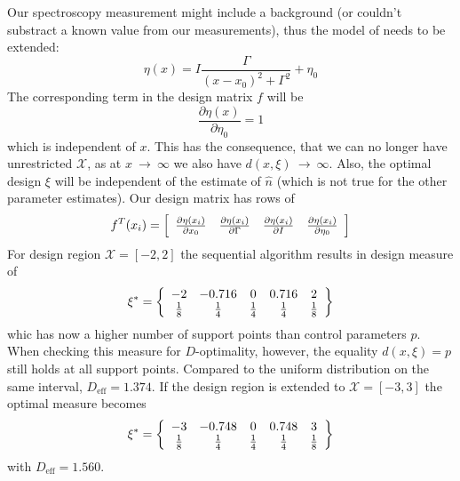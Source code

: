 \documentclass[12pt]{iopart}
\begin{document}
Our spectroscopy measurement might include a background (or couldn't substract a known value from our measurements), thus the model of  needs to be extended:
\begin{equation}
\eta(x) = I \frac{\Gamma}{(x - x_0)^2 + \Gamma^2} + \eta_0
\label{eq:lorentz4}
\end{equation}
The corresponding term in the design matrix $f$ will be
\begin{equation}
\frac{\partial \eta(x)}{\partial \eta_0} = 1
\end{equation}
which is independent of $x$. This has the consequence, that we can no longer have unrestricted $\mathcal{X}$, as at $x~\rightarrow~\infty$ we also have $d(x,\xi)~\rightarrow~\infty$. Also, the optimal design $\xi$ will be independent of the estimate of $\hat n$ (which is not true for the other parameter estimates). Our design matrix has rows of
\begin{equation}
 f^T(x_i) = \left[
  \begin{array}{l l l l}
   \frac{\partial \eta(x_i)}{\partial x_0} & \frac{\partial \eta(x_i)}{\partial \Gamma} & \frac{\partial \eta(x_i)}{\partial I} & \frac{\partial \eta(x_i)}{\partial \eta_0}
  \end{array} \right ]
\end{equation}
For design region $\mathcal{X} = [-2, 2]$ the sequential algorithm results in design measure of
\begin{equation}
\xi^* = \left\{
  \begin{array}{c c c c c}
    -2 & -0.716 & 0 & 0.716 & 2\\
    \frac{1}{8} & \frac{1}{4} & \frac{1}{4} & \frac{1}{4} & \frac{1}{8}\\
  \end{array} \right \}
\end{equation}
whic has now a higher number of support points than control parameters $p$. When checking this measure for $D$-optimality, however, the equality $d(x, \xi) = p$ still holds at all support points. Compared to the uniform distribution on the same interval, $D_\mathrm{eff} = 1.374$. If the design region is extended to $\mathcal{X} = [-3, 3]$ the optimal measure becomes
\begin{equation}
\xi^* = \left\{
  \begin{array}{c c c c c}
    -3 & -0.748 & 0 & 0.748 & 3\\
    \frac{1}{8} & \frac{1}{4} & \frac{1}{4} & \frac{1}{4} & \frac{1}{8}\\
  \end{array} \right \}
\end{equation}
with $D_\mathrm{eff} = 1.560$.
\end{document}
